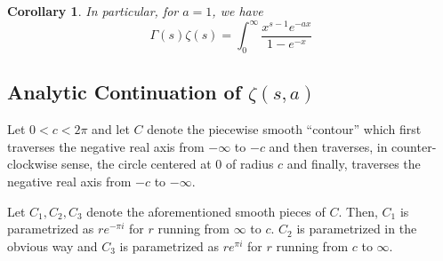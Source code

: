 \documentclass[12pt]{article}
\theoremstyle{thmstyle}
\theoremstyle{defstyle}
\newtheorem*{corollary}{Corollary}
\begin{document}
\begin{corollary}
    In particular, for $a = 1$, we have 
    \begin{equation*}
        \Gamma(s)\zeta(s) = \int_0^\infty\frac{x^{s - 1}e^{-ax}}{1 - e^{-x}}
    \end{equation*}
\end{corollary}

\subsection{Analytic Continuation of \texorpdfstring{$\zeta(s, a)$}{}}

Let $0 < c < 2\pi$ and let $C$ denote the piecewise smooth ``contour'' which first traverses the negative real axis from $-\infty$ to $-c$ and then traverses, in counter-clockwise sense, the circle centered at $0$ of radius $c$ and finally, traverses the negative real axis from $-c$ to $-\infty$. 

Let $C_1, C_2, C_3$ denote the aforementioned smooth pieces of $C$. Then, $C_1$ is parametrized as $re^{-\pi i }$ for $r$ running from $\infty$ to $c$. $C_2$ is parametrized in the obvious way and $C_3$ is parametrized as $re^{\pi i}$ for $r$ running from $c$ to $\infty$.
\end{document}
